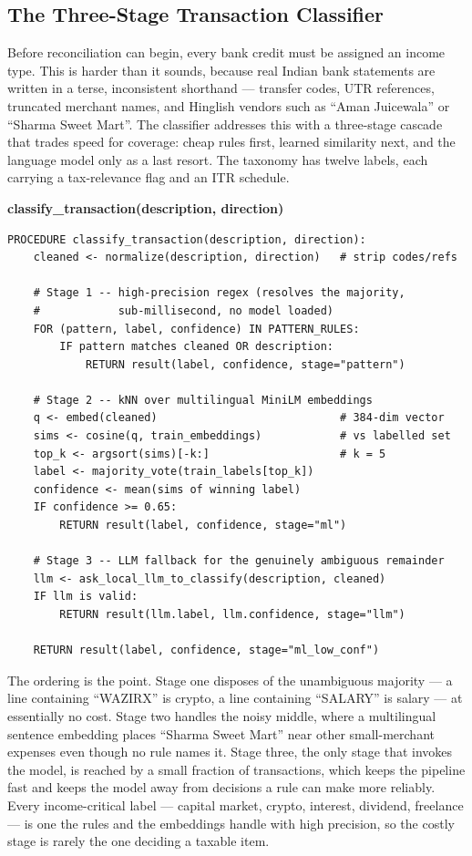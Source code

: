 \documentclass[12pt, a4paper, oneside]{report}
\newcommand{\algname}[1]{\par\vspace{0.6em}\noindent\textbf{\ttfamily #1}\nopagebreak}
\begin{document}
\subsection{The Three-Stage Transaction Classifier}
Before reconciliation can begin, every bank credit must be assigned an income
type. This is harder than it sounds, because real Indian bank statements are
written in a terse, inconsistent shorthand --- transfer codes, UTR references,
truncated merchant names, and Hinglish vendors such as ``Aman Juicewala'' or
``Sharma Sweet Mart''. The classifier addresses this with a three-stage cascade
that trades speed for coverage: cheap rules first, learned similarity next, and
the language model only as a last resort. The taxonomy has twelve labels, each
carrying a tax-relevance flag and an ITR schedule.

\algname{classify\_transaction(description, direction)}
\begin{lstlisting}[style=pseudo]
PROCEDURE classify_transaction(description, direction):
    cleaned <- normalize(description, direction)   # strip codes/refs

    # Stage 1 -- high-precision regex (resolves the majority,
    #            sub-millisecond, no model loaded)
    FOR (pattern, label, confidence) IN PATTERN_RULES:
        IF pattern matches cleaned OR description:
            RETURN result(label, confidence, stage="pattern")

    # Stage 2 -- kNN over multilingual MiniLM embeddings
    q <- embed(cleaned)                            # 384-dim vector
    sims <- cosine(q, train_embeddings)            # vs labelled set
    top_k <- argsort(sims)[-k:]                    # k = 5
    label <- majority_vote(train_labels[top_k])
    confidence <- mean(sims of winning label)
    IF confidence >= 0.65:
        RETURN result(label, confidence, stage="ml")

    # Stage 3 -- LLM fallback for the genuinely ambiguous remainder
    llm <- ask_local_llm_to_classify(description, cleaned)
    IF llm is valid:
        RETURN result(llm.label, llm.confidence, stage="llm")

    RETURN result(label, confidence, stage="ml_low_conf")
\end{lstlisting}

The ordering is the point. Stage one disposes of the unambiguous majority --- a
line containing ``WAZIRX'' is crypto, a line containing ``SALARY'' is salary ---
at essentially no cost. Stage two handles the noisy middle, where a multilingual
sentence embedding places ``Sharma Sweet Mart'' near other small-merchant
expenses even though no rule names it. Stage three, the only stage that invokes
the model, is reached by a small fraction of transactions, which keeps the
pipeline fast and keeps the model away from decisions a rule can make more
reliably. Every income-critical label --- capital market, crypto, interest,
dividend, freelance --- is one the rules and the embeddings handle with high
precision, so the costly stage is rarely the one deciding a taxable item.
\end{document}
